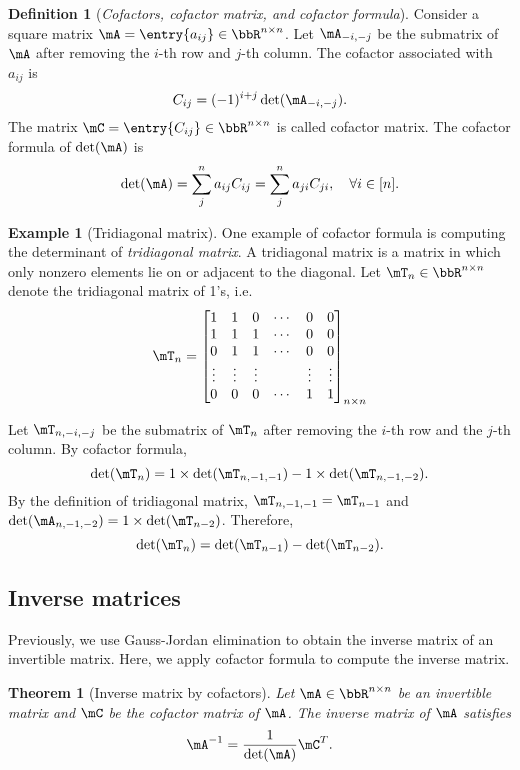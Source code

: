 \documentclass[11pt]{article}
\theoremstyle{plain}
\newtheorem{thm}{Theorem}[section]
\theoremstyle{definition}
\newtheorem{defn}{Definition}
\newtheorem{example}{Example}
\begin{document}
\begin{defn}[\textit{Cofactors, cofactor matrix, and cofactor formula}]
	Consider a square matrix $\mA=  \entry{a_{ij}} \in \bbR^{n \times n}$. Let $\mA_{-i,-j}$ be the submatrix of $\mA$ after removing the $i$-th row and $j$-th column. The cofactor associated with $a_{ij}$ is \[C_{ij} = (-1)^{i+j}\det(\mA_{-i,-j}).\]
	The matrix $\mC = \entry{C_{ij}} \in \bbR^{n \times n}$ is called cofactor matrix.  The cofactor formula of $\det(\mA)$ is 
	\[ \det(\mA) = \sum_{j}^n a_{ij} C_{ij} = \sum_{j}^n a_{ji} C_{ji} ,\quad \forall i \in [n].  \]
\end{defn}

\begin{example}[Tridiagonal matrix]
	One example of cofactor formula is computing the determinant of \textit{tridiagonal matrix}. A tridiagonal matrix is a matrix in which only nonzero elements lie on or adjacent to the diagonal. Let $\mT_n \in \bbR^{n \times n}$ denote the tridiagonal matrix of 1's, i.e.\
\begin{align}
	\mT_n = \begin{bmatrix}
		1 &1&0 &\cdots & 0 &0\\
		1&1&1&\cdots &0&0\\
		0&1&1&\cdots &0&0\\
		\vdots &\vdots &\vdots &&\vdots &\vdots \\
		0&0&0&\cdots&1&1
	\end{bmatrix}_{n \times n}
\end{align} 

Let $\mT_{n, -i,-j}$ be the submatrix of  $\mT_n$ after removing the $i$-th row and the $j$-th column.   By cofactor formula, 
\[  \det(\mT_n) = 1 \times \det(\mT_{n, -1,-1}) - 1 \times \det(\mT_{n,-1,-2}). \]
By the definition of tridiagonal matrix, $\mT_{n,-1,-1} = \mT_{n-1}$ and $\det( \mA_{n,-1,-2}) = 1 \times \det(\mT_{n-2}) $. Therefore, 
\[ \det(\mT_n) = \det(\mT_{n-1}) - \det(\mT_{n-2}).  \] 
\end{example}

\subsection{Inverse matrices}
Previously, we use Gauss-Jordan elimination to obtain the inverse matrix of an invertible matrix. Here, we apply cofactor formula to compute the inverse matrix.

\begin{thm}[Inverse matrix by cofactors]\label{thm:inver}
Let $\mA \in \bbR^{n \times n}$ be an invertible matrix and $\mC$ be the cofactor matrix of $\mA$. The inverse matrix of $\mA$ satisfies
\[  \mA^{-1} = \frac{1}{\det(\mA)} \mC^T. \]	
\end{thm}
\end{document}
